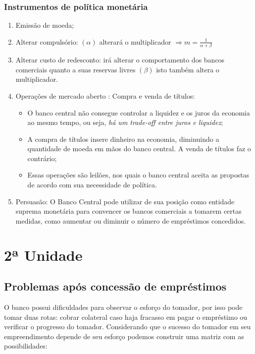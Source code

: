 \documentclass[12pt,a4paper,oneside,brazil]{abntex2}
\begin{document}
\subsection{Instrumentos de política monetária}
\begin{enumerate}
\item Emissão de moeda;
\item Alterar compulsório: $(\alpha)$ alterará o multiplicador $\Rightarrow m = \frac{1}{\alpha + \beta}$
\item Alterar custo de redesconto: irá alterar o comportamento dos bancos comerciais quanto a suas reservas livres $(\beta)$ isto também altera o multiplicador.
\item Operações de mercado aberto : Compra e venda de títulos:
\begin{itemize}
\item O banco central não consegue controlar a liquidez e os juros da economia ao mesmo tempo, ou seja, \emph{há um trade-off entre juros e liquidez};
\item A compra de títulos insere dinheiro na economia, diminuindo a quantidade de moeda em mãos do banco central. A venda de títulos faz o contrário;
\item Essas operações são leilões, nos quais o banco central aceita as propostas de acordo com sua necessidade de política.
\end{itemize}
\item Persuasão: O Banco Central pode utilizar de sua posição como entidade suprema monetária para convencer os bancos comerciais a tomarem certas medidas, como aumentar ou diminuir o número de empréstimos concedidos.
\end{enumerate}

\chapter{2ª Unidade}
\section{Problemas após concessão de empréstimos}
O banco possui dificuldades para observar o esforço do tomador, por isso pode tomar duas rotas: 
cobrar colateral caso haja fracasso em pagar o empréstimo ou verificar o progresso do tomador. Considerando que o sucesso do tomador em seu empreendimento depende de seu esforço podemos construir uma matriz com as possibilidades:
\end{document}
